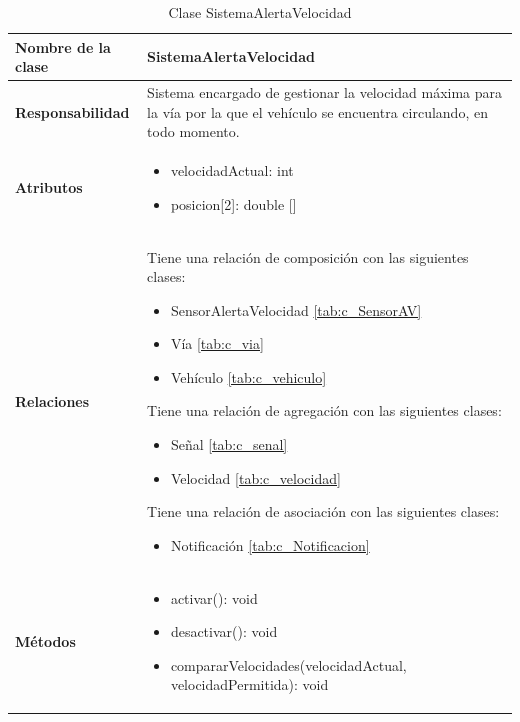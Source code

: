 \begin{table}[h]
\begin{center}
\begin{tabular}{p{} p{11cm}}
\textbf{Nombre de la clase} &  SistemaAlertaVelocidad\\ \hline \hline
\textbf{Responsabilidad} &  Sistema encargado de gestionar la velocidad máxima para la vía por la que el vehículo se encuentra circulando, en todo momento.  \\ \hline
\textbf{Atributos} & \begin{itemize}
                      \item velocidadActual: int
                      \item posicion[2]: double []
                    \end{itemize}\\ \hline
\textbf{Relaciones} & \par Tiene una relación de composición con las siguientes clases:
                      \begin{itemize}
                        \item SensorAlertaVelocidad \ref{tab:c_SensorAV}
                        \item Vía \ref{tab:c_via}
                        \item Vehículo \ref{tab:c_vehiculo}
                      \end{itemize}

                      \par Tiene una relación de agregación con las siguientes clases:
                      \begin{itemize}
                        \item Señal \ref{tab:c_senal}
                        \item Velocidad \ref{tab:c_velocidad}
                      \end{itemize}

                      \par Tiene una relación de asociación con las siguientes clases:
                      \begin{itemize}
                        \item Notificación \ref{tab:c_Notificacion}
                      \end{itemize}

                      \\ \hline

\textbf{Métodos} &  \begin{itemize}
                      \item activar(): void
                      \item desactivar(): void
                      \item compararVelocidades(velocidadActual, velocidadPermitida): void
                    \end{itemize}\\ \hline
\end{tabular}
\caption{Clase SistemaAlertaVelocidad}
\label{tab:c_SAVelocidad}
\end{center}
\end{table}

